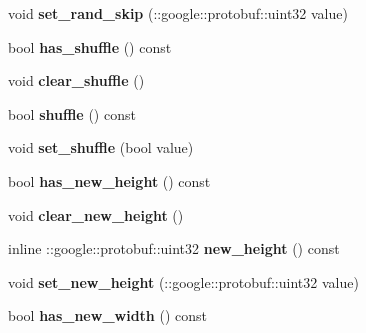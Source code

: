 \begin{DoxyCompactItemize}
void {\bfseries set\+\_\+rand\+\_\+skip} (\+::google\+::protobuf\+::uint32 value)
\item 
\mbox{\label{classcaffe_1_1_image_data_parameter_ab05c6e1cce920eb0d9e3ff713a169850}} 
bool {\bfseries has\+\_\+shuffle} () const
\item 
\mbox{\label{classcaffe_1_1_image_data_parameter_a18bc8f14e5463678b7d0cfe719b6c822}} 
void {\bfseries clear\+\_\+shuffle} ()
\item 
\mbox{\label{classcaffe_1_1_image_data_parameter_a40e362b226ca4bf8c1e535b50b281792}} 
bool {\bfseries shuffle} () const
\item 
\mbox{\label{classcaffe_1_1_image_data_parameter_aca8839fd8141b73db5f53cbe16b180ad}} 
void {\bfseries set\+\_\+shuffle} (bool value)
\item 
\mbox{\label{classcaffe_1_1_image_data_parameter_a4bc22dd8baa02b9ba7a9f2aa4e5327b9}} 
bool {\bfseries has\+\_\+new\+\_\+height} () const
\item 
\mbox{\label{classcaffe_1_1_image_data_parameter_aa476df32cb4bf04a7bafc428c46f9e43}} 
void {\bfseries clear\+\_\+new\+\_\+height} ()
\item 
\mbox{\label{classcaffe_1_1_image_data_parameter_a47c6713df9bbc67aa79f72ccba8b2329}} 
inline \+::google\+::protobuf\+::uint32 {\bfseries new\+\_\+height} () const
\item 
\mbox{\label{classcaffe_1_1_image_data_parameter_a3e5996c15927ccc14f3601241ebdd18d}} 
void {\bfseries set\+\_\+new\+\_\+height} (\+::google\+::protobuf\+::uint32 value)
\item 
\mbox{\label{classcaffe_1_1_image_data_parameter_ad5d6ef8ff6787e055c9bd6280e8e91cc}} 
bool {\bfseries has\+\_\+new\+\_\+width} () const
\item 
\mbox{\label{classcaffe_1_1_image_data_parameter_ae9829aaddb47321696ef6ea84c3fa66c}} 

\end{DoxyCompactItemize}
